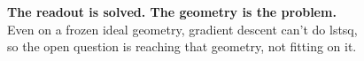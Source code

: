 \documentclass[aspectratio=169,10pt]{beamer}
\begin{document}
{
\begin{frame}[plain]
  \vfill
  \begin{center}
    {\Large\bfseries The readout is solved. The geometry is the problem.}\\[0.8em]
    {\large Even on a frozen ideal geometry, gradient descent can't do lstsq,\\
    so the open question is reaching that geometry, not fitting on it.}
  \end{center}
  \vfill
\end{frame}
}
\end{document}
